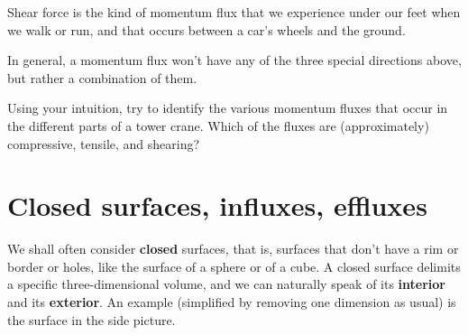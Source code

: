 \documentclass[a4paper,12pt,%
onecolumn,oneside,titlepage,%
british%
]{memoir}
\renewcommand*{\|}[1][]{\nonscript\:#1\vert\nonscript\:\mathopen{}}
\begin{document}
Shear force is the kind of momentum flux that we experience under our feet when we walk or run, and that occurs between a car's wheels and the ground.

\bigskip

In general, a momentum flux won't have any of the three special directions above, but rather a combination of them.


\begin{exercise}
  Using your intuition, try to identify the various momentum fluxes that occur in the different parts of a tower crane. Which of the fluxes are (approximately) compressive, tensile, and shearing?
\end{exercise}



\section{Closed surfaces, influxes, effluxes}
\label{sec:in_out_flux}

We shall often consider \textbf{closed} surfaces, that is, surfaces that don't have a rim or border or holes, like the surface of a sphere or of a cube. A closed surface delimits a specific three-dimensional volume, and we can naturally speak of its \textbf{interior} and its \textbf{exterior}. An example (simplified by removing one dimension as usual) is the surface in the side picture.
\end{document}

